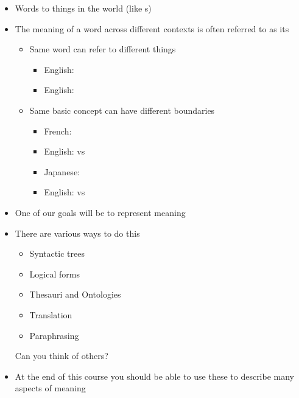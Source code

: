 \documentclass[a4paper,landscape,headrule,footrule,xetex,25pt]{foils}
\begin{document}
\begin{itemize}
\item Words  to things in the world (like s)
\item The meaning of a word across different contexts is often referred to as its 
  \begin{itemize}
  \item Same word can refer to different things
    \begin{itemize}
    \item English: 
    \item English: 
    \end{itemize}
  \item Same basic concept can have different boundaries
    \begin{itemize}
    \item French: 
    \item English:  vs 
      
    \item Japanese: 
    \item English:  vs 
    \end{itemize}
  \end{itemize}
\end{itemize}




\begin{itemize}
\item One of our goals will be to represent meaning
\item There are various ways to do this
  \begin{itemize}
  \item Syntactic trees
  \item Logical forms
  \item Thesauri and Ontologies 
  \item Translation
  \item Paraphrasing
  \end{itemize}
Can you think of others?

\item At the end of this course you should be able to use these to
  describe many aspects of meaning
\end{itemize}
\end{document}
